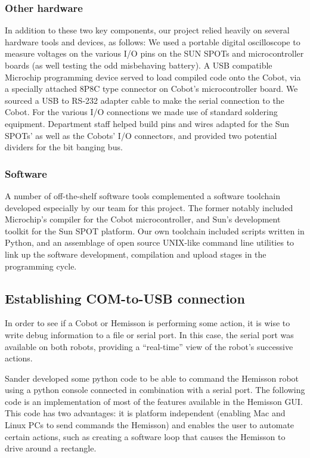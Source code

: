 \documentclass[a4paper,10pt]{article} %
\begin{document}
\subsubsection{Other hardware}

\noindent In addition to these two key components, our project relied heavily on
several hardware tools and devices, as follows: We used a portable digital
oscilloscope to measure voltages on the various I/O pins on the SUN SPOTs and
microcontroller boards (as well testing the odd misbehaving battery). A USB
compatible Microchip programming device served to load compiled code onto the
Cobot, via a specially attached 8P8C type connector on Cobot's microcontroller
board. We sourced a USB to RS-232 adapter cable to make the serial connection to
the Cobot. For the various I/O connections we made use of standard soldering
equipment. Department staff helped build pins and wires adapted for the Sun
SPOTs' as well as the Cobots' I/O connectors, and provided two potential
dividers for the bit banging bus.

\subsubsection{Software}

A number of off-the-shelf software tools complemented a software toolchain
developed especially by our team for this project. The former notably included
Microchip's compiler for the Cobot microcontroller, and Sun's development toolkit
for the Sun SPOT platform. Our own toolchain included scripts written in Python,
and an assemblage of open source UNIX-like command line utilities to link up the
software development, compilation and upload stages in the programming cycle.


\subsection{Establishing COM-to-USB connection} %
\label{sub:Establishing COM-to-USB connection}

In order to see if a Cobot or Hemisson is performing some action, it is wise to
write debug information to a file or serial port. In this case, the serial port
was available on both robots, providing a ``real-time'' view of the
robot's successive actions.

Sander developed some python code to be able to command the Hemisson robot using
a python console connected in combination with a serial port. The following code
is an implementation of most of the features available in the Hemisson GUI.
This code has two advantages: it is platform independent (enabling Mac and Linux
PCs to send commands the Hemisson) and enables the user to automate certain
actions, such as creating a software loop that causes the Hemisson to drive
around a rectangle.
\end{document}
